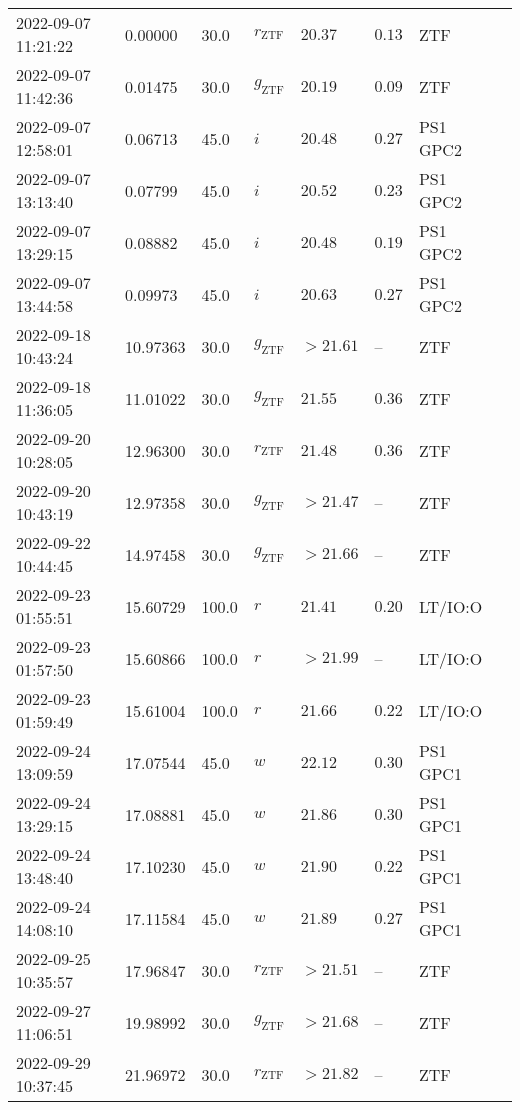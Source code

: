 \documentclass{nature_plusfigure}
\begin{document}
\begin{supplement}
\begin{center}
\begin{longtable}{llllllll}
2022-09-07 11:21:22 & 0.00000 & 30.0 & ${r}_\mathrm{ZTF}$ & $20.37$ & $0.13$ & ZTF &  \\ 
2022-09-07 11:42:36 & 0.01475 & 30.0 & ${g}_\mathrm{ZTF}$ & $20.19$ & $0.09$ & ZTF &  \\ 
2022-09-07 12:58:01 & 0.06713 & 45.0 & $i$ & $20.48$ & $0.27$ & PS1 GPC2 &  \\ 
2022-09-07 13:13:40 & 0.07799 & 45.0 & $i$ & $20.52$ & $0.23$ & PS1 GPC2 &  \\ 
2022-09-07 13:29:15 & 0.08882 & 45.0 & $i$ & $20.48$ & $0.19$ & PS1 GPC2 &  \\ 
2022-09-07 13:44:58 & 0.09973 & 45.0 & $i$ & $20.63$ & $0.27$ & PS1 GPC2 &  \\ 
2022-09-18 10:43:24 & 10.97363 & 30.0 & ${g}_\mathrm{ZTF}$ & $>21.61$ & -- & ZTF &  \\ 
2022-09-18 11:36:05 & 11.01022 & 30.0 & ${g}_\mathrm{ZTF}$ & $21.55$ & $0.36$ & ZTF &  \\ 
2022-09-20 10:28:05 & 12.96300 & 30.0 & ${r}_\mathrm{ZTF}$ & $21.48$ & $0.36$ & ZTF &  \\ 
2022-09-20 10:43:19 & 12.97358 & 30.0 & ${g}_\mathrm{ZTF}$ & $>21.47$ & -- & ZTF &  \\ 
2022-09-22 10:44:45 & 14.97458 & 30.0 & ${g}_\mathrm{ZTF}$ & $>21.66$ & -- & ZTF &  \\ 
2022-09-23 01:55:51 & 15.60729 & 100.0 & $r$ & $21.41$ & $0.20$ & LT/IO:O &  \\ 
2022-09-23 01:57:50 & 15.60866 & 100.0 & $r$ & $>21.99$ & -- & LT/IO:O &  \\ 
2022-09-23 01:59:49 & 15.61004 & 100.0 & $r$ & $21.66$ & $0.22$ & LT/IO:O &  \\ 
2022-09-24 13:09:59 & 17.07544 & 45.0 & $w$ & $22.12$ & $0.30$ & PS1 GPC1 &  \\ 
2022-09-24 13:29:15 & 17.08881 & 45.0 & $w$ & $21.86$ & $0.30$ & PS1 GPC1 &  \\ 
2022-09-24 13:48:40 & 17.10230 & 45.0 & $w$ & $21.90$ & $0.22$ & PS1 GPC1 &  \\ 
2022-09-24 14:08:10 & 17.11584 & 45.0 & $w$ & $21.89$ & $0.27$ & PS1 GPC1 &  \\ 
2022-09-25 10:35:57 & 17.96847 & 30.0 & ${r}_\mathrm{ZTF}$ & $>21.51$ & -- & ZTF &  \\ 
2022-09-27 11:06:51 & 19.98992 & 30.0 & ${g}_\mathrm{ZTF}$ & $>21.68$ & -- & ZTF &  \\ 
2022-09-29 10:37:45 & 21.96972 & 30.0 & ${r}_\mathrm{ZTF}$ & $>21.82$ & -- & ZTF &  \\ 

\end{longtable}
\end{center}
\end{supplement}
\end{document}
